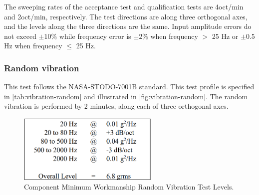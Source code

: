 The sweeping rates of the acceptance test and qualification tests are 4oct/min and 2oct/min, respectively. The test directions are along three orthogonal axes, and the levels along the three directions are the same. Input amplitude errors do not exceed $\pm 10$\% while frequency error is $\pm2$\% when frequency $>$ 25 Hz or $\pm0.5$ Hz when frequency $\leq$ 25 Hz.



\subsubsection{Random vibration}

 This test follows the NASA-STODO-7001B standard. This test profile is specified in \autoref{tab:vibration-random} and illustrated in \autoref{fig:vibration-random}. The random vibration is performed by 2 minutes, along each of three orthogonal axes.

\begin{figure}[!htb]
    \begin{center}
        \includegraphics[width=0.6\textwidth]{figures/random-vibration.png}
        \caption{Component Minimum Workmanship Random Vibration Test Levels.}
        \label{tab:vibration-random}
    \end{center}
\end{figure}

